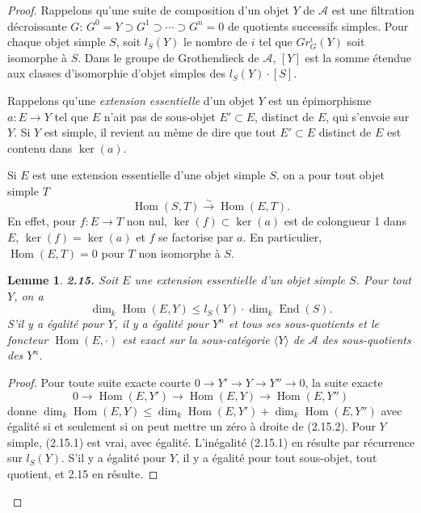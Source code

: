 \documentclass[12pt,a4paper]{article}
\theoremstyle{plain}
\newtheorem{lemma}[theorem]{Lemme}
\theoremstyle{definition}
\theoremstyle{remark}
\DeclareMathOperator{\Hom}{Hom}
\DeclareMathOperator{\End}{End}
\begin{document}
\begin{proof}
Rappelons qu'une suite de composition d'un objet $Y$ de $\mathcal{A}$ est une filtration décroissante $G$: $G^0 = Y \supset G^1 \supset \cdots \supset G^n = 0$ de quotients successifs simples. Pour chaque objet simple $S$, soit $l_S(Y)$ le nombre de $i$ tel que $Gr_G^i(Y)$ soit isomorphe à $S$. Dans le groupe de Grothendieck de $\mathcal{A}$, $[Y]$ est la somme étendue aux classes d'isomorphie d'objet simples des $l_S(Y) \cdot [S]$.

Rappelons qu'une \emph{extension essentielle} d'un objet $Y$ est un épimorphisme $a : E \to Y$ tel que $E$ n'ait pas de sous-objet $E' \subset E$, distinct de $E$, qui s'envoie sur $Y$. Si $Y$ est simple, il revient au même de dire que tout $E' \subset E$ distinct de $E$ est contenu dans $\ker(a)$.

Si $E$ est une extension essentielle d'une objet simple $S$, on a pour tout objet simple $T$
\[
\Hom(S,T) \xrightarrow{\sim} \Hom(E,T).
\]
En effet, pour $f : E \to T$ non nul, $\ker(f) \subset \ker(a)$ est de colongueur 1 dans $E$, $\ker(f) = \ker(a)$ et $f$ se factorise par $a$. En particulier, $\Hom(E,T) = 0$ pour $T$ non isomorphe à $S$.

\begin{lemma}\label{lem:2.15}
\textbf{2.15.} Soit $E$ une extension essentielle d'un objet simple $S$. Pour tout $Y$, on a
\begin{equation}\label{eq:2.15.1}
\dim_k \Hom(E,Y) \leq l_S(Y) \cdot \dim_k \End(S).
\end{equation}
S'il y a égalité pour $Y$, il y a égalité pour $Y^n$ et tous ses sous-quotients et le foncteur $\Hom(E, \cdot)$ est exact sur la sous-catégorie $\langle Y \rangle$ de $\mathcal{A}$ des sous-quotients des $Y^n$.
\end{lemma}

\begin{proof}
Pour toute suite exacte courte $0 \to Y' \to Y \to Y'' \to 0$, la suite exacte
\begin{equation}\label{eq:2.15.2}
0 \to \Hom(E,Y') \to \Hom(E,Y) \to \Hom(E,Y'')
\end{equation}
donne $\dim_k \Hom(E,Y) \leq \dim_k \Hom(E,Y') + \dim_k \Hom(E,Y'')$ avec égalité si et seulement si on peut mettre un zéro à droite de (2.15.2). Pour $Y$ simple, (2.15.1) est vrai, avec égalité. L'inégalité (2.15.1) en résulte par récurrence sur $l_S(Y)$. S'il y a égalité pour $Y$, il y a égalité pour tout sous-objet, tout quotient, et 2.15 en résulte.
\end{proof}


\end{proof}
\end{document}

